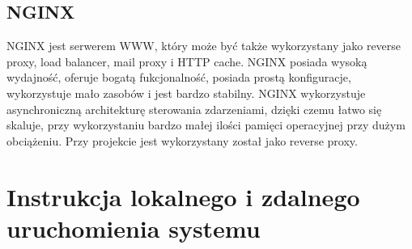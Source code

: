 \documentclass[12pt,a4paper]{article}
\begin{document}
		\subsection{NGINX}
			\indent NGINX jest serwerem WWW, który może być także wykorzystany jako reverse proxy, load balancer, mail proxy i HTTP cache. NGINX posiada wysoką wydajność, oferuje
			bogatą fukcjonalność, posiada prostą konfiguracje, wykorzystuje mało zasobów i jest bardzo stabilny. NGINX wykorzystuje asynchroniczną architekturę sterowania zdarzeniami,
			dzięki czemu łatwo się skaluje, przy wykorzystaniu bardzo małej ilości pamięci operacyjnej przy dużym obciążeniu. Przy projekcie jest wykorzystany został jako reverse proxy.
	\newpage
		
	\section{Instrukcja lokalnego i zdalnego uruchomienia systemu}
\end{document}
